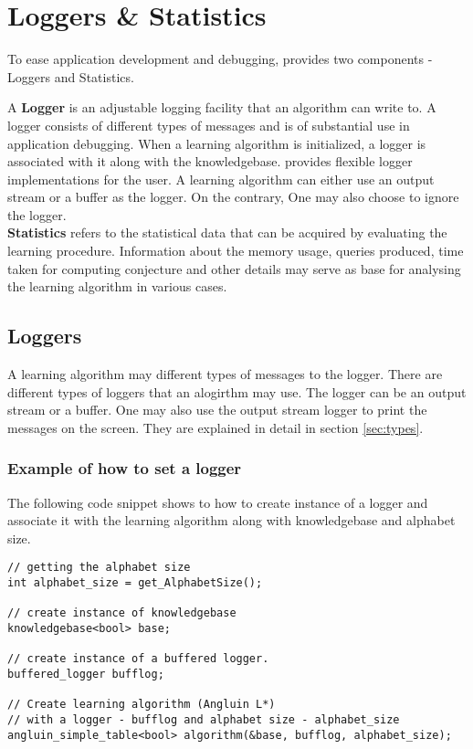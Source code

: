 \chapter{Loggers \& Statistics}

To ease application development and debugging, \libalf provides two components - Loggers and Statistics. 

A \textbf{Logger} is an adjustable logging facility that an algorithm can write to. A logger consists of different types of messages and is of substantial use in application debugging. When a learning algorithm is initialized, a logger is associated with it along with the knowledgebase. \libalf provides flexible logger implementations for the user. A learning algorithm can either use an output stream or a buffer as the logger. On the contrary, One may also choose to ignore the logger. \\

\textbf{Statistics} refers to the statistical data that can be acquired by evaluating the learning procedure. Information about the memory usage, queries produced, time taken for computing conjecture and other details may serve as base for analysing the learning algorithm in various cases. 

\section{Loggers}

A learning algorithm may different types of messages to the logger. There are different types of loggers that an alogirthm may use. The logger can be an output stream or a buffer. One may also use the output stream logger to print the messages on the screen. They are explained in detail in section \ref{sec:types}.

\subsection*{Example of how to set a logger}
The following code snippet shows to how to create instance of a logger and associate it with the learning algorithm along with knowledgebase and alphabet size.
\begin{lstlisting}
// getting the alphabet size
int alphabet_size = get_AlphabetSize(); 

// create instance of knowledgebase
knowledgebase<bool> base; 

// create instance of a buffered logger.
buffered_logger bufflog; 

// Create learning algorithm (Angluin L*) 
// with a logger - bufflog and alphabet size - alphabet_size
angluin_simple_table<bool> algorithm(&base, bufflog, alphabet_size); 
\end{lstlisting}

